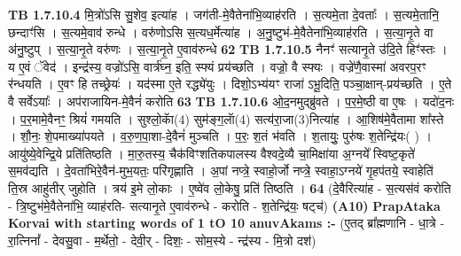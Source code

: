 \documentclass[17pt]{extarticle}
\begin{document}
                  \newline
                                \textbf{ TB 1.7.10.4} \newline
                  मि॒त्रो॑ऽसि सु॒शेव॒ इत्या॑ह । जग॑ती-मे॒वैतेना॑भि॒व्याह॑रति । स॒त्यमे॒ता दे॒वताः᳚ । स॒त्यमे॒तानि॒ छन्दाꣳ॑सि । स॒त्यमे॒वाव॑ रुन्धे । वरु॑णोऽसि स॒त्यध॒र्मेत्या॑ह । अ॒नु॒ष्टुभ॑-मे॒वैतेना॑भि॒व्याह॑रति । स॒त्या॒नृ॒ते वा अ॑नु॒ष्टुप् । स॒त्या॒नृ॒ते वरु॑णः । स॒त्या॒नृ॒ते ए॒वाव॑रुन्धे \textbf{ 62} \newline
                  \newline
                                \textbf{ TB 1.7.10.5} \newline
                  नैनꣳ॑ सत्यानृ॒ते उ॑दि॒ते हिꣳ॑स्तः । य ए॒वं ॅवेद॑ । इन्द्र॑स्य॒ वज्रो॑ऽसि॒ वार्त्र॑घ्न॒ इति॒ स्फ्यं प्रय॑च्छति । वज्रो॒ वै स्फ्यः । वज्रे॑णै॒वास्मा॑ अवरप॒रꣳ र॑न्धयति । ए॒वꣳ हि तच्छ्रेयः॑ । यद॑स्मा ए॒ते रद्ध्ये॑युः । दिशो॒ऽभ्य॑यꣳ राजा॑ ऽभू॒दिति॒ पञ्चा॒क्षान्-प्रय॑च्छति । ए॒ते वै सर्वेऽयाः᳚ । अप॑राजायिन-मे॒वैनं॑ करोति \textbf{ 63} \newline
                  \newline
                                \textbf{ TB 1.7.10.6} \newline
                  ओ॒द॒नमुद्ब्रु॑वते । प॒र॒मे॒ष्ठी वा ए॒षः । यदो॑द॒नः । प॒र॒मामे॒वैनꣳ॒॒ श्रियं॑ गमयति । सुश्लो॒काॅ(4) सुम॑ङ्ग॒लाॅ(4) सत्य॑रा॒जा(3)नित्या॑ह । आ॒शिष॑मे॒वैतामा शा᳚स्ते । शौ॒नः॒ शे॒पमाख्या॑पयते । व॒रु॒ण॒पा॒शा-दे॒वैनं॑ मुञ्चति । प॒रः॒ श॒तं भ॑वति । श॒तायुः॒ पुरु॑षः श॒तेन्द्रि॑यः( ) । आयु॑ष्ये॒वेन्द्रि॒ये प्रति॑तिष्ठति । मा॒रु॒तस्य॒ चैक॑विꣳशतिकपालस्य वैश्वदे॒व्यै चा॒मिक्षा॑या अ॒ग्नये᳚ स्विष्ट॒कृते॑ स॒मव॑द्यति । दे॒वता॑भिरे॒वैन॑-मुभ॒यतः॒ परि॑गृह्णाति । अ॒पां नप्त्रे॒ स्वाहो॒र्जो नप्त्रे॒ स्वाहा॒ऽग्नये॑ गृ॒हप॑तये॒ स्वाहेति॑ ति॒स्र आहु॑तीर् जुहोति । त्रय॑ इ॒मे लो॒काः । ए॒ष्वे॑व लो॒केषु॒ प्रति॑ तिष्ठति । \textbf{ 64} \newline
                  \newline
                                    (दे॒वैरित्या॑ह - स॒त्यस॑वं करोति - त्रि॒ष्टुभ॑मे॒वैतेना॑भि॒ व्याह॑रति- सत्यानृ॒ते ए॒वाव॑रुन्धे - करोति - श॒तेन्द्रि॑यः॒ षट्च॑) \textbf{(A10)} \newline \newline
                \textbf{PrapAtaka Korvai with starting  words of 1 tO 10 anuvAkams :-} \newline
        (ए॒तद् ब्रा᳚ह्मणानि - धा॒त्रे - रा॒त्निनां᳚ - देवसु॒वा - म॒र्थेतो॒ - देवी॒र् - दिशः॒ - सोम॒स्ये - न्द्र॑स्य - मि॒त्रो दश॑) \newline
\end{document}
